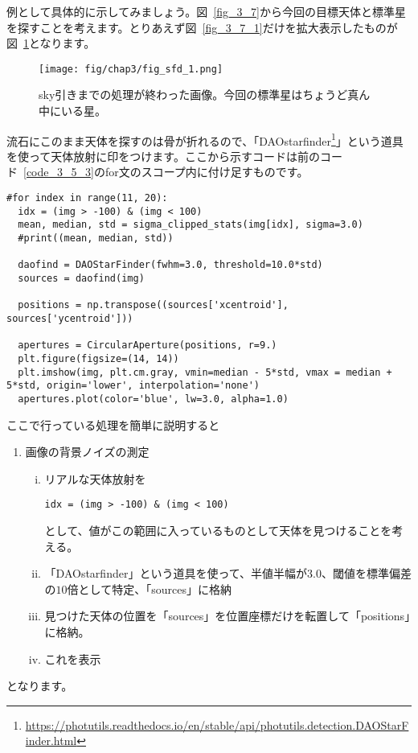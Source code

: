 例として具体的に示してみましょう。図~\ref{fig_3_7}から今回の目標天体と標準星を探すことを考えます。とりあえず図~\ref{fig_3_7_1}だけを拡大表示したものが図~\ref{fig_3_8}となります。
\begin{figure}
  \centering
  \texttt{[image: fig/chap3/fig\_sfd\_1.png]}
  \caption[sky引きまでの処理が終わった画像]{sky引きまでの処理が終わった画像。今回の標準星はちょうど真ん中にいる星。\label{fig_3_8}}
\end{figure}
流石にこのまま天体を探すのは骨が折れるので、「DAOstarfinder\footnote{\url{https://photutils.readthedocs.io/en/stable/api/photutils.detection.DAOStarFinder.html}}」という道具を使って天体放射に印をつけます。ここから示すコードは前のコード~\ref{code_3_5_3}のfor文のスコープ内に付け足すものです。
\begin{lstlisting}[caption=天体放射への印づけ,label=code_3_6_1]
#for index in range(11, 20):
  idx = (img > -100) & (img < 100)
  mean, median, std = sigma_clipped_stats(img[idx], sigma=3.0)
  #print((mean, median, std))

  daofind = DAOStarFinder(fwhm=3.0, threshold=10.0*std)
  sources = daofind(img)

  positions = np.transpose((sources['xcentroid'], sources['ycentroid']))

  apertures = CircularAperture(positions, r=9.)
  plt.figure(figsize=(14, 14))
  plt.imshow(img, plt.cm.gray, vmin=median - 5*std, vmax = median + 5*std, origin='lower', interpolation='none')
  apertures.plot(color='blue', lw=3.0, alpha=1.0)
\end{lstlisting}
ここで行っている処理を簡単に説明すると
\begin{enumerate}[(1)]
  \item 画像の背景ノイズの測定
  \begin{enumerate}[(i)]
    \item リアルな天体放射を\begin{verbatim}idx = (img > -100) & (img < 100)\end{verbatim}として、値がこの範囲に入っているものとして天体を見つけることを考える。
    \item 「DAOstarfinder」という道具を使って、半値半幅が$3.0$、閾値を標準偏差の$10$倍として特定、「sources」に格納
    \item 見つけた天体の位置を「sources」を位置座標だけを転置して「positions」に格納。
    \item これを表示
  \end{enumerate}
\end{enumerate}
となります。

